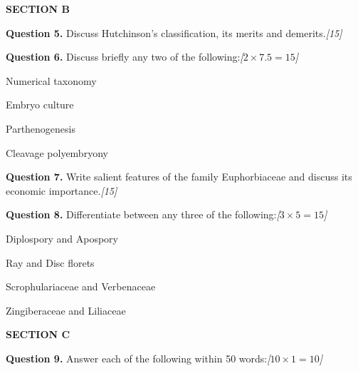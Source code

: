 \documentclass[11pt,a4paper]{article}
\newcommand{\pts}[1]{\hfill   \textit{[#1]}}
\begin{document}
\begin{center}
   \textbf{SECTION B}
\end{center}
\medskip

\medskip


\noindent   \textbf{Question 5.} Discuss Hutchinson's classification, its merits and demerits.\pts{15}

\medskip


\noindent   \textbf{Question 6.} Discuss briefly any two of the following:\pts{$2  \times 7.5 = 15$}

\begin{parts}
  \item Numerical taxonomy
  \item Embryo culture
  \item Parthenogenesis
  \item Cleavage polyembryony
\end{parts}

\medskip


\noindent   \textbf{Question 7.} Write salient features of the family Euphorbiaceae and discuss its economic importance.\pts{15}

\medskip


\noindent   \textbf{Question 8.} Differentiate between any three of the following:\pts{$3  \times 5 = 15$}

\begin{parts}
  \item Diplospory and Apospory
  \item Ray and Disc florets
  \item Scrophulariaceae and Verbenaceae
  \item Zingiberaceae and Liliaceae
\end{parts}

\bigskip

\begin{center}
   \textbf{SECTION C}
\end{center}
\medskip

\medskip


\noindent   \textbf{Question 9.} Answer each of the following within 50 words:\pts{$10  \times 1 = 10$}
\end{document}

